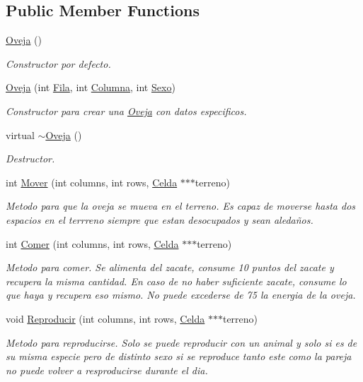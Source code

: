 \subsection*{Public Member Functions}
\begin{DoxyCompactItemize}
\item 
\hyperlink{classOveja_a816d51452247a98f55372b7407de0366}{Oveja} ()
\begin{DoxyCompactList}\small\item\em Constructor por defecto. \end{DoxyCompactList}\item 
\hyperlink{classOveja_a28cf77d31dc8d1770f52380a1ba1088e}{Oveja} (int \hyperlink{classAnimal_ab403adfd13b57143eff123bdd6a2febb}{Fila}, int \hyperlink{classAnimal_a340d64e6e4ffe5f35e0855c63aad1bd3}{Columna}, int \hyperlink{classAnimal_a42b629ae5a7e0c05263a3f6e592ea116}{Sexo})
\begin{DoxyCompactList}\small\item\em Constructor para crear una \hyperlink{classOveja}{Oveja} con datos especificos. \end{DoxyCompactList}\item 
virtual \hyperlink{classOveja_a90e76a79dba9138b13c26ba0b1b3c2cf}{$\sim$\+Oveja} ()
\begin{DoxyCompactList}\small\item\em Destructor. \end{DoxyCompactList}\item 
int \hyperlink{classOveja_acd0a8a66853f3b0937b03ccd4d9d4b58}{Mover} (int columns, int rows, \hyperlink{classCelda}{Celda} $\ast$$\ast$$\ast$terreno)
\begin{DoxyCompactList}\small\item\em Metodo para que la oveja se mueva en el terreno. Es capaz de moverse hasta dos espacios en el terrreno siempre que estan desocupados y sean aledaños. \end{DoxyCompactList}\item 
int \hyperlink{classOveja_ac22b74a090e0a74a945ff07530192540}{Comer} (int columns, int rows, \hyperlink{classCelda}{Celda} $\ast$$\ast$$\ast$terreno)
\begin{DoxyCompactList}\small\item\em Metodo para comer. Se alimenta del zacate, consume 10 puntos del zacate y recupera la misma cantidad. En caso de no haber suficiente zacate, consume lo que haya y recupera eso mismo. No puede excederse de 75 la energia de la oveja. \end{DoxyCompactList}\item 
void \hyperlink{classOveja_af97a947a8b74d64e0fac191aad43e2d7}{Reproducir} (int columns, int rows, \hyperlink{classCelda}{Celda} $\ast$$\ast$$\ast$terreno)
\begin{DoxyCompactList}\small\item\em Metodo para reproducirse. Solo se puede reproducir con un animal y solo si es de su misma especie pero de distinto sexo si se reproduce tanto este como la pareja no puede volver a resproducirse durante el dia. \end{DoxyCompactList}\end{DoxyCompactItemize}

